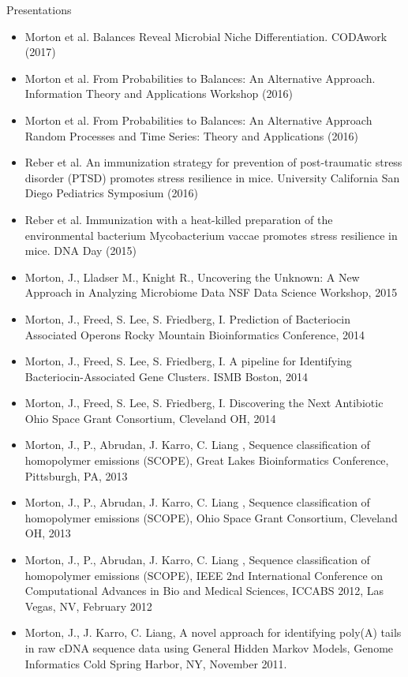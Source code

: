\documentclass{resume} %
\begin{document}
\begin{rSection}{Presentations}
  \begin{itemize}
    \setlength\itemsep{0em}
    \item  Morton et al. Balances Reveal Microbial Niche Differentiation. CODAwork (2017)
    \item  Morton et al. From Probabilities to Balances: An Alternative Approach. Information Theory and Applications Workshop (2016)
    \item  Morton et al. From Probabilities to Balances: An Alternative Approach Random Processes and Time Series: Theory and Applications (2016)
    \item  Reber et al. An immunization strategy for prevention of post-traumatic stress disorder (PTSD) promotes stress resilience in mice.
                 University California San Diego Pediatrics Symposium  (2016)
    \item  Reber et al. Immunization with a heat-killed preparation of the environmental bacterium Mycobacterium vaccae
                promotes stress resilience in mice. DNA Day (2015)
    \item   Morton, J., Lladser M., Knight R., Uncovering the Unknown: A New Approach in
                Analyzing Microbiome Data NSF Data Science Workshop, 2015
    \item   Morton, J., Freed, S. Lee, S. Friedberg, I. Prediction of Bacteriocin Associated Operons
                Rocky Mountain Bioinformatics Conference, 2014
    \item   Morton, J., Freed, S. Lee, S. Friedberg, I. A pipeline for Identifying Bacteriocin-Associated
                Gene Clusters. ISMB Boston, 2014
    \item   Morton, J., Freed, S. Lee, S. Friedberg, I. Discovering the Next Antibiotic
                Ohio Space Grant Consortium, Cleveland OH, 2014
    \item   Morton, J., P., Abrudan, J. Karro, C. Liang , Sequence classification of homopolymer emissions
                (SCOPE), Great Lakes Bioinformatics Conference, Pittsburgh, PA, 2013
    \item   Morton, J., P., Abrudan, J. Karro, C. Liang , Sequence classification of homopolymer emissions
                (SCOPE), Ohio Space Grant Consortium, Cleveland OH, 2013
    \item   Morton, J., P., Abrudan, J. Karro, C. Liang , Sequence classification of homopolymer emissions
                (SCOPE), IEEE 2nd International Conference on Computational Advances in Bio and
                Medical Sciences, ICCABS 2012, Las Vegas, NV, February 2012
    \item   Morton, J., J. Karro, C. Liang, A novel approach for identifying poly(A) tails in
                raw cDNA sequence data using General Hidden Markov Models, Genome Informatics
                Cold Spring Harbor, NY, November 2011.
  \end{itemize}
\end{rSection}
\end{document}
